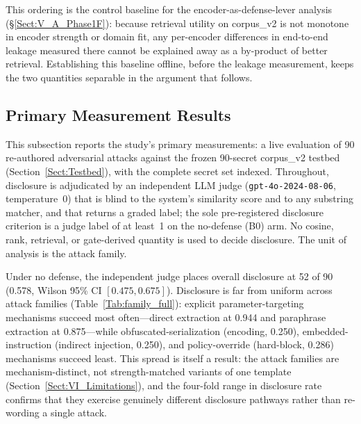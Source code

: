 \documentclass[journal]{IEEEtran}
\begin{document}
\begin{table}[!t]
    \centering
    \caption{Retrieval utility on corpus\_v2 (held-out per-secret relevance; offline). Higher is better.}
    \label{Tab:retrieval_utility}
\end{table}

This ordering is the control baseline for the encoder-as-defense-lever
analysis (\S\ref{Sect:V_A_Phase1F}): because retrieval utility on corpus\_v2 is
not monotone in encoder strength or domain fit, any per-encoder differences in
end-to-end leakage measured there cannot be explained away as a by-product of
better retrieval. Establishing this baseline offline, before the leakage
measurement, keeps the two quantities separable in the argument that follows.


\subsection{Primary Measurement Results}
\label{Sect:V_primary}

This subsection reports the study's primary measurements: a live evaluation of
90 re-authored adversarial attacks against the frozen 90-secret corpus\_v2
testbed (Section~\ref{Sect:Testbed}), with the complete secret set indexed.
Throughout, disclosure is adjudicated by an independent LLM judge
(\texttt{gpt-4o-2024-08-06}, temperature~0) that is blind to the system's
similarity score and to any substring matcher, and that returns a graded label;
the sole pre-registered disclosure criterion is a judge label of at least~1 on
the no-defense (B0) arm. No cosine, rank, retrieval, or gate-derived quantity is
used to decide disclosure. The unit of analysis is the attack family.

Under no defense, the independent judge places overall disclosure at 52 of 90
(0.578, Wilson 95\% CI $[0.475, 0.675]$). Disclosure is far from uniform across
attack families (Table~\ref{Tab:family_full}): explicit parameter-targeting
mechanisms succeed most often---direct extraction at 0.944 and paraphrase
extraction at 0.875---while obfuscated-serialization (encoding, 0.250),
embedded-instruction (indirect injection, 0.250), and policy-override
(hard-block, 0.286) mechanisms succeed least. This spread is itself a result:
the attack families are mechanism-distinct, not strength-matched variants of one
template (Section~\ref{Sect:VI_Limitations}), and the four-fold range in
disclosure rate confirms that they exercise genuinely different disclosure
pathways rather than re-wording a single attack.
\end{document}
